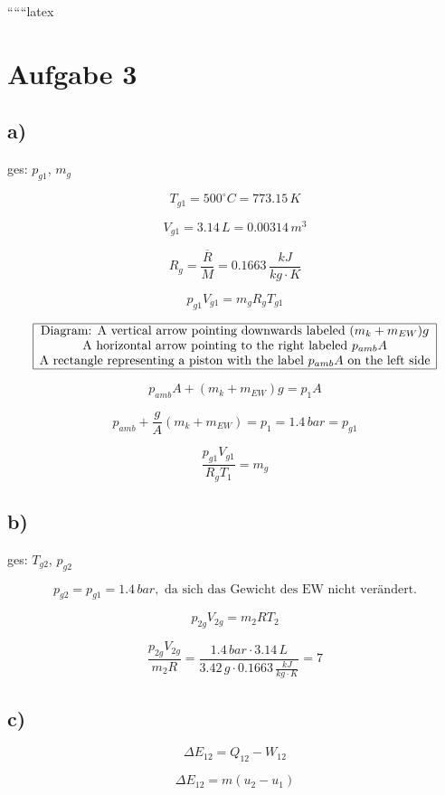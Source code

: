 
``````latex


\section*{Aufgabe 3}

\subsection*{a)}
ges: $p_{g1}$, $m_g$

\[
T_{g1} = 500^\circ C = 773.15 \, K
\]

\[
V_{g1} = 3.14 \, L = 0.00314 \, m^3
\]

\[
R_g = \frac{\overline{R}}{M} = 0.1663 \, \frac{kJ}{kg \cdot K}
\]

\[
p_{g1} V_{g1} = m_g R_g T_{g1}
\]

\[
\begin{array}{|c|}
\hline
\text{Diagram: A vertical arrow pointing downwards labeled } (m_k + m_{EW})g \\
\text{A horizontal arrow pointing to the right labeled } p_{amb} A \\
\text{A rectangle representing a piston with the label } p_{amb} A \text{ on the left side} \\
\hline
\end{array}
\]

\[
p_{amb} A + (m_k + m_{EW})g = p_{1} A
\]

\[
p_{amb} + \frac{g}{A} (m_k + m_{EW}) = p_{1} = 1.4 \, bar = p_{g1}
\]

\[
\frac{p_{g1} V_{g1}}{R_g T_{1}} = m_g
\]

\subsection*{b)}
ges: $T_{g2}$, $p_{g2}$

\[
p_{g2} = p_{g1} = 1.4 \, bar, \text{ da sich das Gewicht des EW nicht verändert.}
\]

\[
p_{2g} V_{2g} = m_2 R T_2
\]

\[
\frac{p_{2g} V_{2g}}{m_2 R} = \frac{1.4 \, bar \cdot 3.14 \, L}{3.42 \, g \cdot 0.1663 \, \frac{kJ}{kg \cdot K}} = 7
\]

\subsection*{c)}
\[
\Delta E_{12} = Q_{12} - W_{12}
\]

\[
\Delta E_{12} = m (u_2 - u_1)
\]

